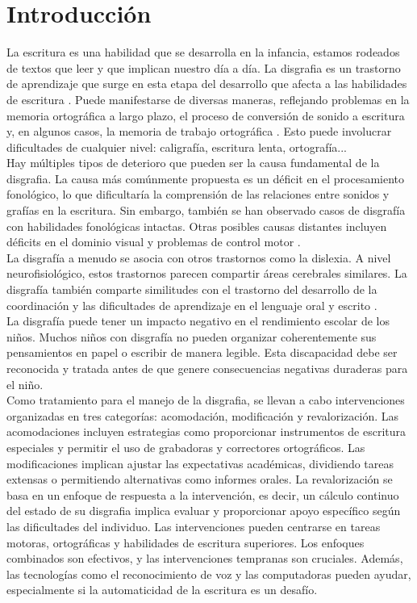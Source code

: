 \section{Introducción}
La escritura es una habilidad que se desarrolla en la infancia, estamos rodeados de textos que leer y que implican nuestro día a día. La disgrafia es un trastorno de aprendizaje que surge en esta etapa del desarrollo que afecta a las habilidades de escritura \cite{Chung2015}. Puede manifestarse de diversas maneras, reflejando problemas en la memoria ortográfica a largo plazo, el proceso de conversión de sonido a escritura y, en algunos casos, la memoria de trabajo ortográfica \cite{ McCloskey2017}. Esto puede involucrar dificultades de cualquier nivel: caligrafía, escritura lenta, ortografía...\\

Hay múltiples tipos de deterioro que pueden ser la causa fundamental de la disgrafia.  La causa más comúnmente propuesta es un déficit en el procesamiento fonológico, lo que dificultaría la comprensión de las relaciones entre sonidos y grafías en la escritura. Sin embargo, también se han observado casos de disgrafía con habilidades fonológicas intactas. Otras posibles causas distantes incluyen déficits en el dominio visual y problemas de control motor \cite{ McCloskey2017}.\\

La disgrafía a menudo se asocia con otros trastornos como la dislexia. A nivel neurofisiológico, estos trastornos parecen compartir áreas cerebrales similares. La disgrafía también comparte similitudes con el trastorno del desarrollo de la coordinación y las dificultades de aprendizaje en el lenguaje oral y escrito \cite{Marek2020}. \\

La disgrafía puede tener un impacto negativo en el rendimiento escolar de los niños. Muchos niños con disgrafía no pueden organizar coherentemente sus pensamientos en papel o escribir de manera legible. Esta discapacidad debe ser reconocida y tratada antes de que genere consecuencias negativas duraderas para el niño. \cite{ Crouch2007} \\



Como tratamiento para el manejo de la disgrafia, se llevan a cabo intervenciones organizadas en tres categorías: acomodación, modificación y revalorización. Las acomodaciones incluyen estrategias como proporcionar instrumentos de escritura especiales y permitir el uso de grabadoras y correctores ortográficos. Las modificaciones implican ajustar las expectativas académicas, dividiendo tareas extensas o permitiendo alternativas como informes orales. La revalorización se basa en un enfoque de respuesta a la intervención, es decir, un cálculo continuo del estado de su disgrafia implica evaluar y proporcionar apoyo específico según las dificultades del individuo. Las intervenciones pueden centrarse en tareas motoras, ortográficas y habilidades de escritura superiores. Los enfoques combinados son efectivos, y las intervenciones tempranas son cruciales. Además, las tecnologías como el reconocimiento de voz y las computadoras pueden ayudar, especialmente si la automaticidad de la escritura es un desafío. \cite{Chung2015}